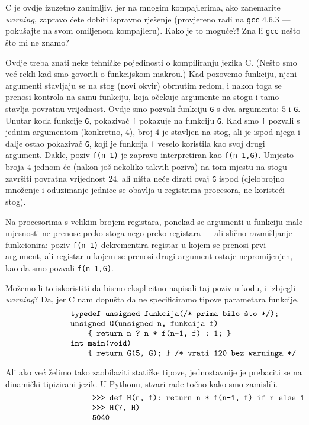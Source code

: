 C je ovdje izuzetno zanimljiv, jer na mnogim kompajlerima, ako zanemarite \emph{warning}, zapravo ćete dobiti ispravno rješenje (provjereno radi na \texttt{gcc} 4.6.3 --- pokušajte na svom omiljenom kompajleru). Kako je to moguće?! Zna li \texttt{gcc} nešto što mi ne znamo?

Ovdje treba znati neke tehničke pojedinosti o kompiliranju jezika C. (Nešto smo već rekli kad smo govorili o funkcijskom makrou.) Kad pozovemo funkciju, njeni argumenti stavljaju se na stog (novi okvir) obrnutim redom, i nakon toga se prenosi kontrola na samu funkciju, koja očekuje argumente na stogu i tamo stavlja povratnu vrijednost. Ovdje smo pozvali funkciju \texttt{G} s dva argumenta: $5$ i \texttt{G}. Unutar koda funkcije \texttt{G}, pokazivač \texttt f pokazuje na funkciju \texttt{G}. Kad smo \texttt f pozvali s jednim argumentom (konkretno, $4$), broj $4$ je stavljen na stog, ali je ispod njega i dalje ostao pokazivač \texttt{G}, koji je funkcija \texttt f veselo koristila kao svoj drugi argument. Dakle, poziv \texttt{f(n-1)} je zapravo interpretiran kao \texttt{f(n-1,G)}. Umjesto broja $4$ jednom će (nakon još nekoliko takvih poziva) na tom mjestu na stogu završiti povratna vrijednost $24$, ali ništa neće dirati ovaj \texttt{G} ispod (cjelobrojno množenje i oduzimanje jednice se obavlja u registrima procesora, ne koristeći stog).

Na procesorima s velikim brojem registara, ponekad se argumenti u funkciju male mjesnosti ne prenose preko stoga nego preko registara --- ali slično razmišljanje funkcionira: poziv \texttt{f(n-1)} dekrementira registar u kojem se prenosi prvi argument, ali registar u kojem se prenosi drugi argument ostaje nepromijenjen, kao da smo pozvali \texttt{f(n-1,G)}.

Možemo li to iskoristiti da bismo eksplicitno napisali taj poziv u kodu, i izbjegli \emph{warning}? Da, jer C nam dopušta da ne specificiramo tipove parametara funkcije.
\begin{equation}\begin{minipage}{0.8\textwidth}
\begin{verbatim}
       typedef unsigned funkcija(/* prima bilo što */);
       unsigned G(unsigned n, funkcija f)
           { return n ? n * f(n-1, f) : 1; }
       int main(void)
           { return G(5, G); } /* vrati 120 bez warninga */
\end{verbatim}
\end{minipage}\end{equation}

Ali ako već želimo tako zaobilaziti statičke tipove, jednostavnije je prebaciti se na dinamički tipizirani jezik. U Pythonu, stvari rade točno kako smo zamislili.
\begin{equation}\begin{minipage}{0.8\textwidth}
\begin{verbatim}
            >>> def H(n, f): return n * f(n-1, f) if n else 1
            >>> H(7, H)
            5040
\end{verbatim}
\end{minipage}\end{equation}

